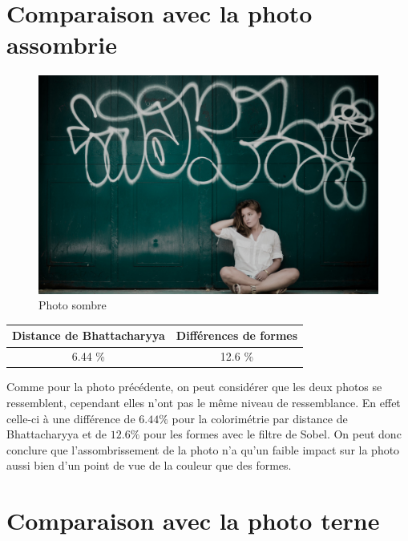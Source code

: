 \documentclass[]{article}
\begin{document}
\newpage

\section{Comparaison avec la photo
assombrie}\label{comparaison-avec-la-photo-assombrie}

\begin{figure}[htbp]
\centering
\includegraphics{photos/sombre.jpg}
\caption{Photo sombre}
\end{figure}

\begin{center}
\begin{tabular}{|c|c|}
  \hline
  Distance de Bhattacharyya & Différences de formes \\
  \hline
  6.44 \% & 12.6 \% \\
  \hline
\end{tabular}
\end{center}

Comme pour la photo précédente, on peut considérer que les deux photos
se ressemblent, cependant elles n'ont pas le même niveau de
ressemblance. En effet celle-ci à une différence de $6.44 \%$ pour la
colorimétrie par distance de Bhattacharyya et de $12.6 \%$ pour les
formes avec le filtre de Sobel. On peut donc conclure que
l'assombrissement de la photo n'a qu'un faible impact sur la photo aussi
bien d'un point de vue de la couleur que des formes.

\newpage

\section{Comparaison avec la photo
terne}\label{comparaison-avec-la-photo-terne}
\end{document}
